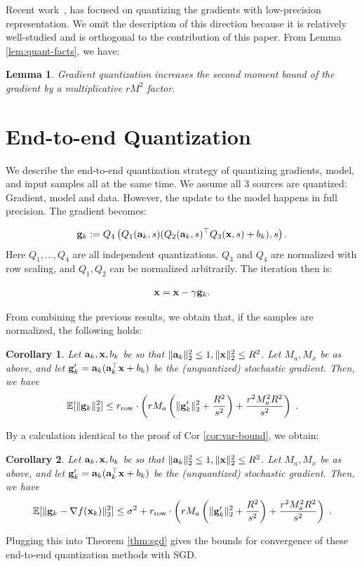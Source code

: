 \documentclass{article}
\def\a{{\bf a}}
\def\g{{\bf g}}
\def\x{{\bf x}}
\def\E{\mathbb{E}}
\def\rrow{r_\mathrm{row}}
\newtheorem{lemma}{Lemma}
\newtheorem{corollary}{Corollary}
\begin{document}
Recent work~\cite{Alistarh:2016:ArXiv, DeSa:NIPS:2015}, has focused on quantizing the gradients 
with low-precision representation.
We omit the description of this direction
because it is relatively well-studied and is orthogonal
to the contribution of this paper.
From Lemma \ref{lem:quant-facts}, we have:

\begin{lemma}
    \label{lem:gradient-quantization}
    Gradient quantization increases the second moment bound of the gradient by a multiplicative $r M^2$ factor. 
\end{lemma}


\section{End-to-end Quantization}

We describe the end-to-end quantization strategy of
quantizing gradients, model, and input samples all 
at the same time. We assume all 3 sources are quantized: Gradient, model and data. However, the update to the model happens in full precision. The gradient becomes:

\begin{eqnarray}
	\g_k := Q_4 \left( Q_1(\a_k, s ) ( Q_2(\a_k, s)^\top Q_3(\x, s) + b_k) , s \right).
\end{eqnarray}
\noindent Here $Q_1, \ldots, Q_4$ are all independent quantizations.  $Q_3$ and  $Q_4$ are normalized with row scaling, and $Q_1, Q_2$ can be normalized arbitrarily.
The iteration then is: 

\begin{eqnarray}
	\x = \x - \gamma \g_k.
\end{eqnarray}

\noindent From combining the previous results, we obtain that, if the samples are normalized, the following holds:

\begin{corollary}
    \label{cor:full-quantization}
    Let $\a_k, \x, b_k$ be so that $\| \a_k \|_2^2 \leq 1, \| \x \|_2^2 \leq R^2$.
    Let $M_a, M_x$ be as above, and let $\g'_k = \a_k (\a_k^\top \x + b_k)$ be the (unquantized) stochastic gradient.
    Then, we have
    \[
    \E [\| \g_k \|_2^2] \leq \rrow \cdot \left( r M_a \left( \| \g'_k \|_2^2 + \frac{R^2}{s^2} \right)  + \frac{r^2 M_a^2 R^2}{s^2} \right) \; .
    \]
\end{corollary}

By a calculation identical to the proof of Cor \ref{cor:var-bound}, we obtain:
\begin{corollary}
    \label{cor:full-quantizationVar}
    Let $\a_k, \x, b_k$ be so that $\| \a_k \|_2^2 \leq 1, \| \x \|_2^2 \leq R^2$.
    Let $M_a, M_x$ be as above, and let $\g'_k = \a_k (\a_k^\top \x + b_k)$ be the (unquantized) stochastic gradient.
    Then, we have
    \[
    \E [\| \g_k - \nabla f(\x_k) \|_2^2] \leq \sigma^2 + \rrow \cdot \left( r M_a \left( \| \g'_k \|_2^2 + \frac{R^2}{s^2} \right)  + \frac{r^2 M_a^2 R^2}{s^2} \right) \; .
    \]
\end{corollary}
Plugging this into Theorem \ref{thm:sgd} gives the bounds for convergence of these end-to-end quantization methods with SGD.
\end{document}
